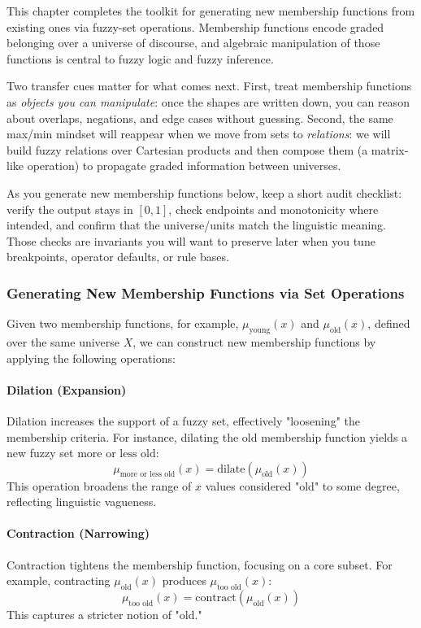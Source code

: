 This chapter completes the toolkit for generating new membership functions from existing ones via fuzzy-set operations. Membership functions encode graded belonging over a universe of discourse, and algebraic manipulation of those functions is central to fuzzy logic and fuzzy inference.

Two transfer cues matter for what comes next. First, treat membership functions as \emph{objects you can manipulate}: once the shapes are written down, you can reason about overlaps, negations, and edge cases without guessing. Second, the same max/min mindset will reappear when we move from sets to \emph{relations}: we will build fuzzy relations over Cartesian products and then compose them (a matrix-like operation) to propagate graded information between universes.

As you generate new membership functions below, keep a short audit checklist: verify the output stays in \([0,1]\), check endpoints and monotonicity where intended, and confirm that the universe/units match the linguistic meaning. Those checks are invariants you will want to preserve later when you tune breakpoints, operator defaults, or rule bases.

\subsubsection{Generating New Membership Functions via Set Operations}
\label{sec:fuzzysets_generating_new_membership_functions_via_set_operations_sub}

Given two membership functions, for example, \(\mu_{\text{young}}(x)\) and \(\mu_{\text{old}}(x)\), defined over the same universe \(X\), we can construct new membership functions by applying the following operations:

\paragraph{Dilation (Expansion)}
Dilation increases the support of a fuzzy set, effectively "loosening" the membership criteria. For instance, dilating the \(\text{old}\) membership function yields a new fuzzy set \(\text{more or less old}\):
\[
\mu_{\text{more or less old}}(x) = \text{dilate}(\mu_{\text{old}}(x))
\]
This operation broadens the range of \(x\) values considered "old" to some degree, reflecting linguistic vagueness.

\paragraph{Contraction (Narrowing)}
Contraction tightens the membership function, focusing on a core subset. For example, contracting \(\mu_{\text{old}}(x)\) produces \(\mu_{\text{too old}}(x)\):
\[
\mu_{\text{too old}}(x) = \text{contract}(\mu_{\text{old}}(x))
\]
This captures a stricter notion of "old."

